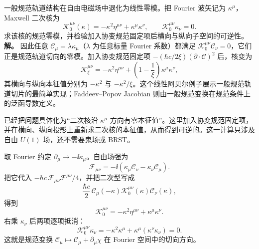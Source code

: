 \begin{exbox}[自由 $U(1)$ 场中的规范零模]
一般规范轨道结构在自由电磁场中退化为线性零模。把 Fourier 波矢记为 $\kappa^\mu$，Maxwell 二次核为
\begin{equation}
 {
 \mathcal K_0^{\mu\nu}(\kappa)
 =-\kappa^2\eta^{\mu\nu}+\kappa^\mu\kappa^\nu,
 \qquad
 \mathcal K_0^{\mu\nu}\kappa_\nu=0.}
 \label{eq:u1-gauge-zero-mode-dp50}
\end{equation}
求该核的规范零模，并检验加入协变规范固定项后横向与纵向子空间的可逆性。
\textbf{解。} 因此任意 $\mathscr C_\mu=\lambda\kappa_\mu$（$\lambda$ 为任意标量 Fourier 系数）都满足 $\mathcal K_0^{\mu\nu}\mathscr C_\nu=0$，它们正是规范轨道切向的零模。加入协变规范固定项 $-(\hbar c/2\xi)(\partial\!\cdot\!\mathscr C)^2$ 后，核变为
\begin{equation}
 {
 \mathcal K_\xi^{\mu\nu}
 =-\kappa^2\eta^{\mu\nu}
 +\left(1-\frac1\xi\right)\kappa^\mu\kappa^\nu,}
 \label{eq:u1-gauge-fixed-kernel-dp50}
\end{equation}
其横向与纵向本征值分别为 $-\kappa^2$ 与 $-\kappa^2/\xi$。这个线性阿贝尔例子展示一般规范轨道切片的最简单实现；Faddeev--Popov Jacobian 则由一般规范变换在规范条件上的泛函导数定义。

\medskip

 已经把问题具体化为“二次核沿 $\kappa^\mu$ 方向有零本征值”。这里加入协变规范固定项，并在横向、纵向投影上重新求二次核的本征值，从而得到可逆的。这一计算只涉及自由 $U(1)$ 场，还不需要鬼场或 BRST。

取 Fourier 约定 $\partial_\mu\to-\ii\kappa_\mu$。自由场强为
\begin{equation*}
 \mathcal F_{\mu\nu}
 =-\ii(\kappa_\mu\mathscr C_\nu-\kappa_\nu\mathscr C_\mu).
\end{equation*}
把它代入 $-\hbar c\,\mathcal F_{\mu\nu}\mathcal F^{\mu\nu}/4$，并把二次型写成
\begin{equation*}
 \frac{\hbar c}{2}\,
 \mathscr C_\mu(-\kappa)\mathcal K_0^{\mu\nu}(\kappa)\mathscr C_\nu(\kappa),
\end{equation*}
得到
\begin{equation*}
 \mathcal K_0^{\mu\nu}
 =-\kappa^2\eta^{\mu\nu}+\kappa^\mu\kappa^\nu.
\end{equation*}
右乘 $\kappa_\nu$ 后两项逐项抵消：
\begin{equation*}
 \mathcal K_0^{\mu\nu}\kappa_\nu
 =-\kappa^2\kappa^\mu+\kappa^\mu(\kappa^\nu\kappa_\nu)=0.
\end{equation*}
这就是规范变换 $\mathscr C_\mu\mapsto\mathscr C_\mu+\partial_\mu\chi$ 在 Fourier 空间中的切向方向。


\end{exbox}
